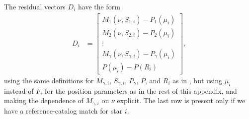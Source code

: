 The residual vectors $D_i$ have the form
\begin{align}
    D_i &= \left[
        \begin{array}{ c }
            M_1\left(\nu, S_{1,i}\right) - P_1\left(\mu_i\right) \\
            M_2\left(\nu, S_{2,i}\right) - P_2\left(\mu_i\right) \\
            \vdots \\
            M_{\gamma}\left(\nu, S_{\gamma,i}\right) - P_{\gamma}\left(\mu_i\right) \\
            P\left(\mu_i\right) - P\left(R_i\right)
        \end{array}
    \right],
\end{align}
using the same definitions for $M_{\gamma,i}$, $S_{\gamma,i}$, $P_{\gamma}$, $P$, and $R_i$ as in , but using $\mu_i$ instead of $F_i$ for the position parameters as in the rest of this appendix, and making the dependence of $M_{\gamma,i}$ on $\nu$ explicit.
The last row is present only if we have a reference-catalog match for star $i$.

